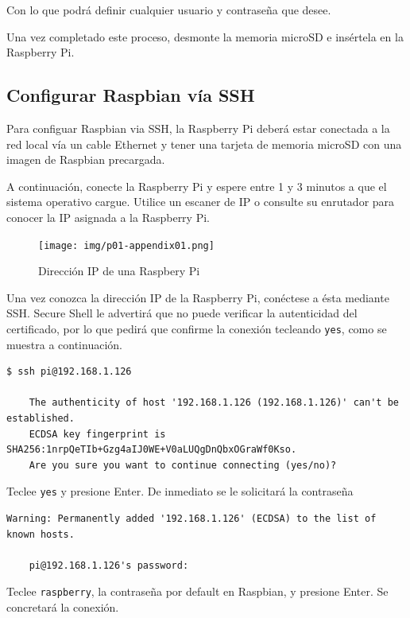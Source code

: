 \documentclass[letterpaper,10.5pt]{article}
\begin{document}
Con lo que podrá definir cualquier usuario y contraseña que desee.

Una vez completado este proceso, desmonte la memoria microSD e insértela en la Raspberry Pi.


\subsection{Configurar Raspbian vía SSH}
Para configuar Raspbian via SSH, la Raspberry Pi deberá estar conectada a la red local vía un cable Ethernet y tener una tarjeta de memoria microSD con una imagen de Raspbian precargada.

A continuación, conecte la Raspberry Pi y espere entre 1 y 3 minutos a que el sistema operativo cargue.
Utilice un escaner de IP o consulte su enrutador para conocer la IP asignada a la Raspberry Pi.

\begin{figure}[H]
	\centering%
	\texttt{[image: img/p01-appendix01.png]} %
	\caption{Dirección IP de una Raspbery Pi}
	\label{fig:raspberry-ip} %
\end{figure}

Una vez conozca la dirección IP de la Raspberry Pi, conéctese a ésta mediante SSH. %
Secure Shell le advertirá que no puede verificar la autenticidad del certificado, por lo que pedirá que confirme la conexión tecleando \texttt{yes}, como se muestra a continuación.

\begin{Verbatim}[fontsize=\footnotesize]
$ ssh pi@192.168.1.126

    The authenticity of host '192.168.1.126 (192.168.1.126)' can't be established.
    ECDSA key fingerprint is SHA256:1nrpQeTIb+Gzg4aIJ0WE+V0aLUQgDnQbxOGraWf0Kso.
    Are you sure you want to continue connecting (yes/no)?
\end{Verbatim}

Teclee \texttt{yes} y presione Enter.
De inmediato se le solicitará la contraseña

\begin{Verbatim}[fontsize=\footnotesize]
    Warning: Permanently added '192.168.1.126' (ECDSA) to the list of known hosts.

    pi@192.168.1.126's password:
\end{Verbatim}

Teclee \texttt{raspberry}, la contraseña por default en Raspbian, y presione Enter.
Se concretará la conexión.
\end{document}
